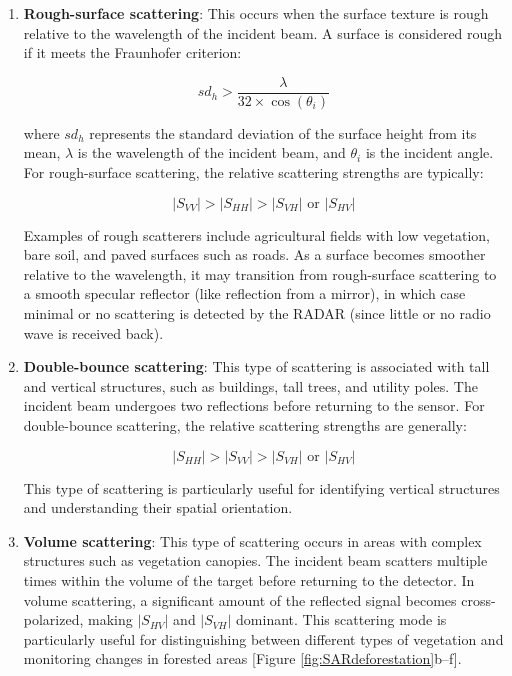 \documentclass[
  12 pt,
]{Nemilov}
\begin{document}
\begin{enumerate}
\def\labelenumi{\arabic{enumi}.}
\item
  \textbf{Rough-surface scattering}: This occurs when the surface texture is rough relative to the wavelength of the incident beam. A surface is considered rough if it meets the Fraunhofer criterion:

  \[ sd_h > \frac{\lambda}{32 \times \cos(\theta_i)} \]

  where \(sd_h\) represents the standard deviation of the surface height from its mean, \(\lambda\) is the wavelength of the incident beam, and \(\theta_i\) is the incident angle. For rough-surface scattering, the relative scattering strengths are typically:

  \[ |S_{VV}| > |S_{HH}| > |S_{VH}| \text{ or } |S_{HV}| \]

  Examples of rough scatterers include agricultural fields with low vegetation, bare soil, and paved surfaces such as roads. As a surface becomes smoother relative to the wavelength, it may transition from rough-surface scattering to a smooth specular reflector (like reflection from a mirror), in which case minimal or no scattering is detected by the RADAR (since little or no radio wave is received back).
\item
  \textbf{Double-bounce scattering}: This type of scattering is associated with tall and vertical structures, such as buildings, tall trees, and utility poles. The incident beam undergoes two reflections before returning to the sensor. For double-bounce scattering, the relative scattering strengths are generally:

  \[ |S_{HH}| > |S_{VV}| > |S_{VH}| \text{ or } |S_{HV}| \]

  This type of scattering is particularly useful for identifying vertical structures and understanding their spatial orientation.
\item
  \textbf{Volume scattering}: This type of scattering occurs in areas with complex structures such as vegetation canopies. The incident beam scatters multiple times within the volume of the target before returning to the detector. In volume scattering, a significant amount of the reflected signal becomes cross-polarized, making \(|S_{HV}|\) and \(|S_{VH}|\) dominant. This scattering mode is particularly useful for distinguishing between different types of vegetation and monitoring changes in forested areas {[}Figure \ref{fig:SARdeforestation}b--f{]}.
\end{enumerate}
\end{document}
